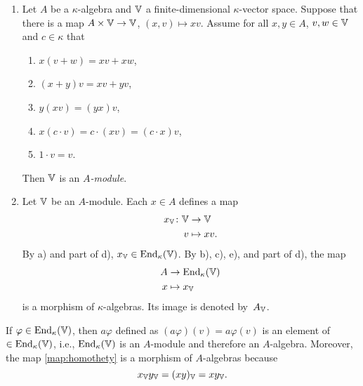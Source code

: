 \begin{defns}${}$
    \begin{enumerate}[-]
        \item Let\/ $A$ be a\/ $\kappa$-algebra and\/ $\mathbb V$ a finite-dimensional\/ $\kappa$-vector space. Suppose that there is a map\/ $A\times\mathbb V\to\mathbb V$, $(x,v)\mapsto xv$. Assume for all\/ $x,y\in A$, $v,w\in\mathbb V$ and\/ $c\in\kappa$ that
        \begin{enumerate}[\rm a)]
            \item $x(v + w) = xv + xw$,
            \item $(x + y)v = xv + yv$,
            \item $y(xv) = (yx)v$,
            \item $x(c\cdot v) = c\cdot(xv) = (c\cdot x)v$,
            \item $1\cdot v = v$.
        \end{enumerate}
        Then\/ $\mathbb V$ is an\/ \textsl{$A$-module}.

        \item Let\/ $\mathbb V$ be an\/ $A$-module. Each\/ $x \in A$ defines a map
        \begin{align*}
            x_\mathbb V\colon\mathbb V&\to\mathbb V\\
            v &\mapsto xv. 
        \end{align*}
        By\/ {\rm a)} and part of\/ {\rm d)}, $x_\mathbb V\in{\operatorname{End}}_\kappa(\mathbb V)$. By\/ {\rm b)}, {\rm c)}, {\rm e)}, and part of\/ {\rm d)}, the map
        \begin{align}\label{map:homothety}
            A&\to{\operatorname{End}}_\kappa(\mathbb V)\\
            x&\mapsto x_\mathbb V\nonumber
        \end{align}
        is a morphism of $\kappa$-algebras. Its image is denoted by\/~$A_\mathbb V$.
    \end{enumerate}
\end{defns}

\begin{rem}\label{rem:End(V)-is-A-algebra}
    If $\varphi\in{\operatorname{End}}_\kappa(\mathbb V)$, then $a\varphi$ defined as $(a\varphi)(v)=a\varphi(v)$ is an element of $\in{\operatorname{End}}_\kappa(\mathbb V)$, i.e., ${\operatorname{End}}_\kappa(\mathbb V)$ is an $A$-module and therefore an $A$-algebra. Moreover, the map \eqref{map:homothety} is a morphism of $A$-algebras because
    $$
        x_\mathbb V y_\mathbb V=(xy)_\mathbb V=xy_\mathbb V.
    $$
\end{rem}

